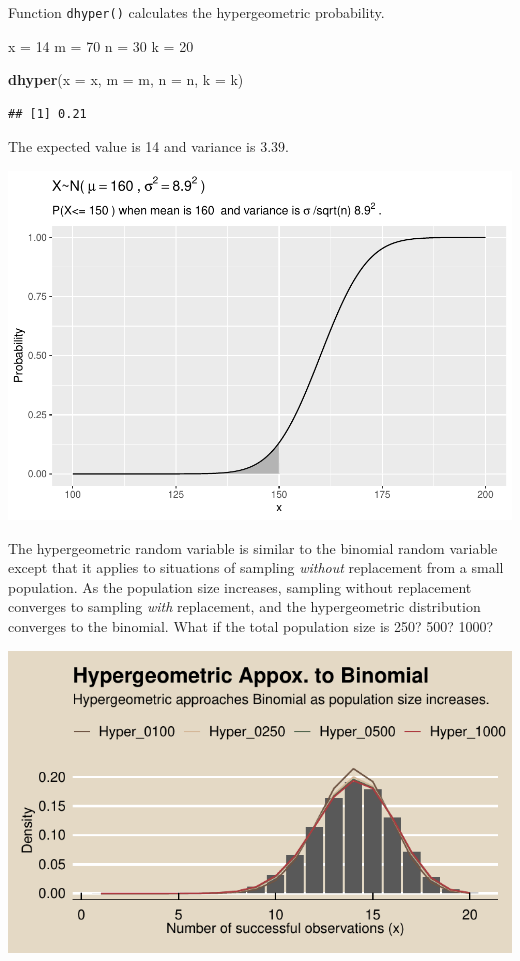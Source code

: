 \documentclass[
]{book}
\newenvironment{Shaded}{\begin{snugshade}}{\end{snugshade}}
\newcommand{\DataTypeTok}[1]{\textcolor[rgb]{0.13,0.29,0.53}{#1}}
\newcommand{\DecValTok}[1]{\textcolor[rgb]{0.00,0.00,0.81}{#1}}
\newcommand{\KeywordTok}[1]{\textcolor[rgb]{0.13,0.29,0.53}{\textbf{#1}}}
\newcommand{\NormalTok}[1]{#1}
\newcommand{\StringTok}[1]{\textcolor[rgb]{0.31,0.60,0.02}{#1}}
\begin{document}
Function \texttt{dhyper()} calculates the hypergeometric probability.

\begin{Shaded}
\begin{Highlighting}[]
\NormalTok{x =}\StringTok{ }\DecValTok{14}
\NormalTok{m =}\StringTok{ }\DecValTok{70}
\NormalTok{n =}\StringTok{ }\DecValTok{30}
\NormalTok{k =}\StringTok{ }\DecValTok{20}

\KeywordTok{dhyper}\NormalTok{(}\DataTypeTok{x =}\NormalTok{ x, }\DataTypeTok{m =}\NormalTok{ m, }\DataTypeTok{n =}\NormalTok{ n, }\DataTypeTok{k =}\NormalTok{ k)}
\end{Highlighting}
\end{Shaded}

\begin{verbatim}
## [1] 0.21
\end{verbatim}

The expected value is 14 and variance is 3.39.

\includegraphics{data-sci_files/figure-latex/unnamed-chunk-19-1.pdf}

The hypergeometric random variable is similar to the binomial random variable except that it applies to situations of sampling \emph{without} replacement from a small population. As the population size increases, sampling without replacement converges to sampling \emph{with} replacement, and the hypergeometric distribution converges to the binomial. What if the total population size is 250? 500? 1000?

\includegraphics{data-sci_files/figure-latex/unnamed-chunk-20-1.pdf}
\end{document}
